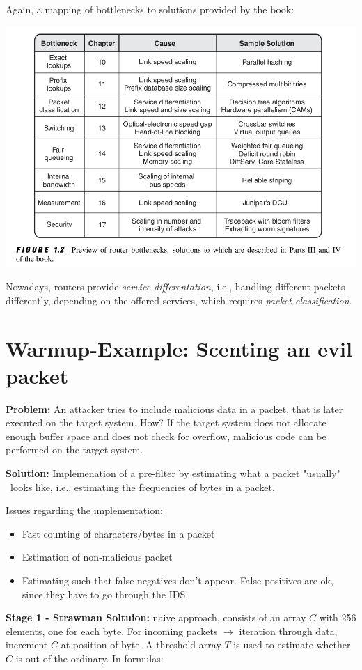 Again, a mapping of bottlenecks to solutions provided by the book:

\includegraphics[width=.8\textwidth]{images/chap1/router_bottlenecks}

Nowadays, routers provide \textit{service differentation}, i.e., handling different packets differently, depending on the offered services, which requires \textit{packet classification}.

\section{Warmup-Example: Scenting an evil packet}

\textbf{Problem:} An attacker tries to include malicious data in a packet, that is later executed on the target system. How? If the target system does not allocate enough buffer space and does not check
for overflow, malicious code can be performed on the target system.

\textbf{Solution:} Implemenation of a pre-filter by estimating what a packet "usually" \ looks like, i.e., estimating the frequencies of bytes in a packet.

Issues regarding the implementation:

\begin{itemize}
	\item Fast counting of characters/bytes in a packet
	\item Estimation of non-malicious packet
	\item Estimating such that false negatives don't appear. False positives are ok, since they have to go through the IDS.
\end{itemize}

\textbf{Stage 1 - Strawman Soltuion:} naive approach, consists of an array $C$ with 256 elements, one for each byte. For incoming packets $\rightarrow$ iteration through data, increment $C$ at position of byte.
A threshold array $T$ is used to estimate whether $C$ is out of the ordinary. In formulas:

